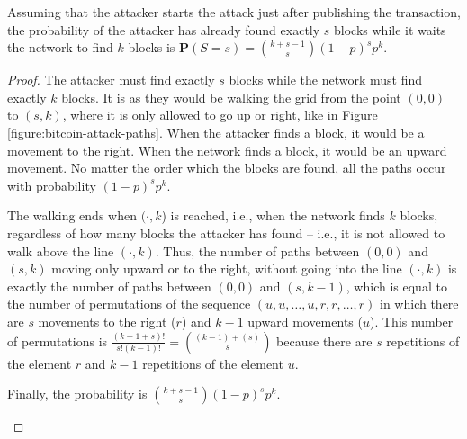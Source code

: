 \begin{theorem}
	Assuming that the attacker starts the attack just after publishing the transaction, the probability of the attacker has already found exactly $s$ blocks while it waits the network to find $k$ blocks is $\mathbf{P}(S = s) = \binom{k+s-1}{s} (1-p)^s p^k.$
\end{theorem}
\begin{proof}
The attacker must find exactly $s$ blocks while the network must find exactly $k$ blocks. It is as they would be walking the grid from the point $(0, 0)$ to $(s, k)$, where it is only allowed to go up or right, like in Figure \ref{figure:bitcoin-attack-paths}. When the attacker finds a block, it would be a movement to the right. When the network finds a block, it would be an upward movement. No matter the order which the blocks are found, all the paths occur with probability $(1-p)^s p^k$.

The walking ends when $(\cdot, k$) is reached, i.e., when the network finds $k$ blocks, regardless of how many blocks the attacker has found -- i.e., it is not allowed to walk above the line $(\cdot, k)$. Thus, the number of paths between $(0, 0)$ and $(s, k)$ moving only upward or to the right, without going into the line $(\cdot, k)$ is exactly the number of paths between $(0, 0)$ and $(s, k-1)$, which is equal to the number of permutations of the sequence $(u, u, \dots, u, r, r, \dots, r)$ in which there are $s$ movements to the right ($r$) and $k-1$ upward movements ($u$). This number of permutations is $\frac{(k-1+s)!}{s!(k-1)!} = \binom{(k-1)+(s)}{s}$ because there are $s$ repetitions of the element $r$ and $k-1$ repetitions of the element $u$.

Finally, the probability is $\binom{k+s-1}{s} (1-p)^{s} p^{k}$.

\begin{figure}[ht]
  \centering
\end{figure}
\end{proof}
